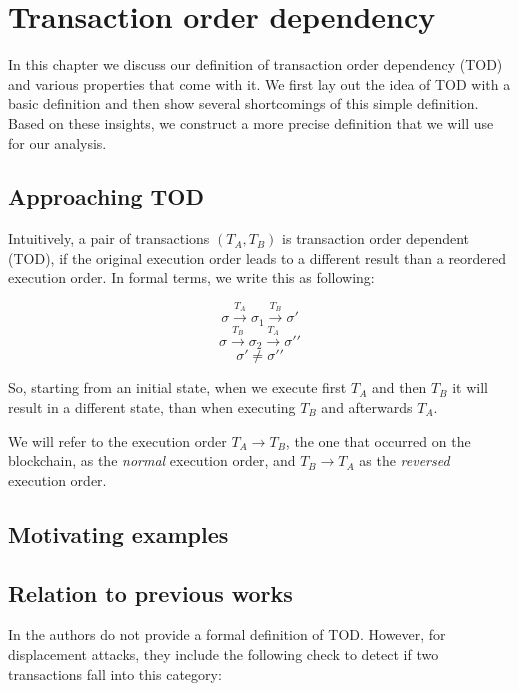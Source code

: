 \documentclass[draft,final]{vutinfth} %
\begin{document}
\chapter{Transaction order dependency}

In this chapter we discuss our definition of transaction order dependency (TOD) and various properties that come with it. We first lay out the idea of TOD with a basic definition and then show several shortcomings of this simple definition. Based on these insights, we construct a more precise definition that we will use for our analysis.

\section{Approaching TOD}

Intuitively, a pair of transactions $(T_A, T_B)$ is transaction order dependent (TOD), if the original execution order leads to a different result than a reordered execution order. In formal terms, we write this as following:

$$\sigma \xrightarrow{T_A} \sigma_1 \xrightarrow{T_B} \sigma \prime$$
$$\sigma \xrightarrow{T_B} \sigma_2 \xrightarrow{T_A} \sigma \prime \prime$$
$$\sigma \prime \neq \sigma \prime \prime$$

So, starting from an initial state, when we execute first $T_A$ and then $T_B$ it will result in a different state, than when executing $T_B$ and afterwards $T_A$.

We will refer to the execution order $T_A \rightarrow T_B$, the one that occurred on the blockchain, as the \emph{normal} execution order, and $T_B \rightarrow T_A$ as the \emph{reversed} execution order.

\section{Motivating examples}


\section{Relation to previous works}

In \cite{torres_frontrunner_2021} the authors do not provide a formal definition of TOD. However, for displacement attacks, they include the following check to detect if two transactions fall into this category:
\end{document}
